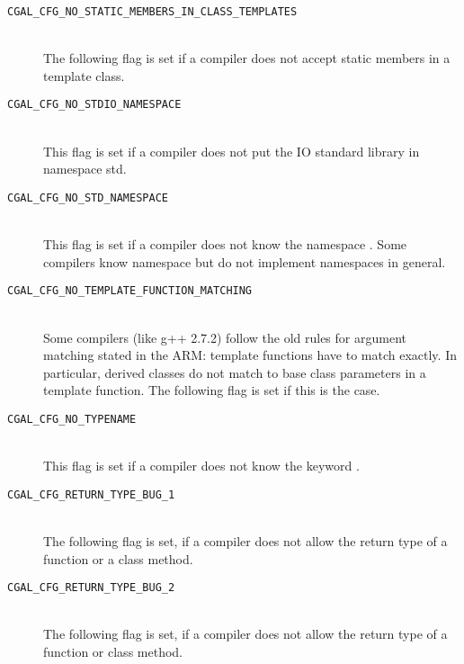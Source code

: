 \begin{description}
\item[{\tt CGAL\_CFG\_NO\_STATIC\_MEMBERS\_IN\_CLASS\_TEMPLATES}]~\\
  The following flag is set if a compiler does not accept static
  members in a template class.
 
\item[{\tt CGAL\_CFG\_NO\_STDIO\_NAMESPACE}]~\\ 
  This flag is
  set if a compiler does not put the IO standard library in namespace
  {\ccFont std}.
 
\item[{\tt CGAL\_CFG\_NO\_STD\_NAMESPACE}]~\\ 
  This flag is
  set if a compiler does not know the namespace .  Some
  compilers know namespace  but do not implement namespaces in
  general.

\item[{\tt CGAL\_CFG\_NO\_TEMPLATE\_FUNCTION\_MATCHING}]~\\
  Some compilers (like g++ 2.7.2) follow the old rules for argument
  matching stated in the ARM: template functions have to match
  exactly. In particular, derived classes do not match to base class
  parameters in a template function. The following flag is set if this
  is the case.

\item[{\tt CGAL\_CFG\_NO\_TYPENAME}]~\\
  This flag is set if a compiler does not know the keyword
  .

\item[{\tt CGAL\_CFG\_RETURN\_TYPE\_BUG\_1}]~\\
  The following flag is set, if a compiler does not allow the return
  type  of a function or a class method.

\item[{\tt CGAL\_CFG\_RETURN\_TYPE\_BUG\_2}]~\\
  The following flag is set, if a compiler does not allow the return
  type  of a function or class method.
\end{description}


